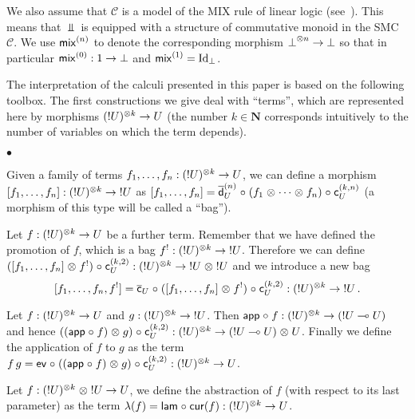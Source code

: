 \documentclass{LMCS}
\newcommand{\nat}{\mathbf{N}}
\newcommand{\Id}[1]{\mathrm{Id}_{#1}}
\newcommand{\scC}{\mathcal{C}}
\begin{document}
We also assume that $\scC$ is a model of the MIX rule of linear logic
(see~\cite{Girard87}). This means that $\Bot$ is equipped with a structure of
commutative monoid in the SMC $\scC$. We use $\mathsf{mix}^{(n)}$ to denote the
corresponding morphism ${\mathord{\perp}}^{\mathord\otimes n}\to{\mathord{\perp}}$ so that in particular $\mathsf{mix}^{(0)}:1\to{\mathord{\perp}}$ and $\Mixn 1=\Id\Bot$.

The interpretation of the calculi presented in this paper is based on the
following toolbox. The first constructions we give deal with ``terms'', which
are represented here by morphisms $({\mathord{!}}{U})^{\mathord\otimes k}\to U$ (the number
$k\in\nat$ corresponds intuitively to the number of variables on which the term
depends).
\begin{iteMize}{$\bullet$}
\item Given a family of terms $f_{1},\dots,f_{n}:({\mathord{!}}{U})^{\mathord\otimes k}\to U$, we can
  define a morphism $[{f_{1},\dots,f_{n}}]:({\mathord{!}}{U})^{\mathord\otimes k}\to{\mathord{!}}{U}$ as
  $[{f_{1},\dots,f_{n}}]={\overline{\mathsf d}}_{U}^{(n)}\mathrel\circ(f_1\mathrel\otimes\cdots\mathrel\otimes f_n)\mathrel\circ\mathsf c_{U}^{(k,n)}$ (a morphism of this type will be called a ``bag'').
\item Let $f:({\mathord{!}}{U})^{\mathord\otimes k}\to U$ be a further term. Remember that
  we have defined the promotion of $f$, which is a bag ${f}^!:({\mathord{!}}{U})^{\mathord\otimes k}\to{\mathord{!}}{U}$. Therefore we can define
  $({[{f_{1},\dots,f_{n}}]}\mathrel\otimes{{f}^!})\mathrel\circ\mathsf c_{U}^{(k,2)}:({\mathord{!}}{U})^{\mathord\otimes k}\to{{\mathord{!}}{U}}\mathrel\otimes{{\mathord{!}}{U}}$ and we introduce a new bag
  \begin{equation*}
    [{f_{1},\dots,f_{n},{f}^!}]=
    {\overline{\mathsf{c}}}_{U}\mathrel\circ({[{f_{1},\dots,f_{n}}]}\mathrel\otimes{{f}^!})\mathrel\circ\mathsf c_{U}^{(k,2)}:({\mathord{!}}{U})^{\mathord\otimes k}\to{\mathord{!}}{U}\,.
  \end{equation*}
\item Let $f:({\mathord{!}}{U})^{\mathord\otimes k}\to U$ and $g:({\mathord{!}}{U})^{\mathord\otimes k}\to
  {\mathord{!}}{U}$. Then $\mathsf{app}\mathrel\circ f:({\mathord{!}}{U})^{\mathord\otimes k}\to({{\mathord{!}}{U}}\multimap{U})$
  and hence $({(\mathsf{app}\mathrel\circ f)}\mathrel\otimes{g})\mathrel\circ\mathsf c_{U}^{(k,2)}:({\mathord{!}}{U})^{\mathord\otimes k}\to{({{\mathord{!}}{U}}\multimap{U})}\mathrel\otimes{U}$. Finally we define the application of
  $f$ to $g$ as the term $f\,g=\mathsf{ev}\mathrel\circ({(\mathsf{app}\mathrel\circ
    f)}\mathrel\otimes{g})\mathrel\circ\mathsf c_{U}^{(k,2)}:({\mathord{!}}{U})^{\mathord\otimes k}\to U$.
\item Let $f:{({\mathord{!}}{U})^{\mathord\otimes k}}\mathrel\otimes{{\mathord{!}}{U}}\to U$, we define the
  abstraction of $f$ (with respect to its last parameter) as the term
  $\lambda(f)=\mathsf{lam}\mathrel\circ\mathsf{cur}(f):({\mathord{!}}{U})^{\mathord\otimes k}\to U$.
\end{iteMize}
\end{document}
